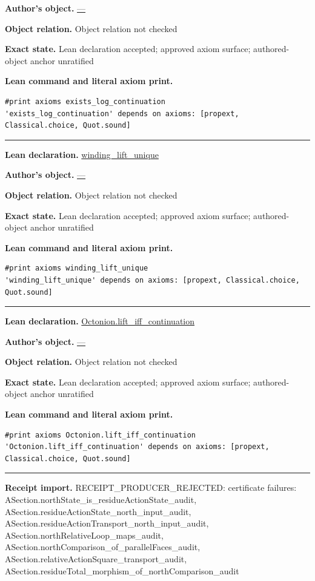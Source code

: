 \documentclass[11pt]{article}
\theoremstyle{plain}
\theoremstyle{definition}
\theoremstyle{remark}
\begin{document}
\begin{tcolorbox}
\par\textbf{Author's object.} \url{—}
\par\textbf{Object relation.} Object relation not checked
\par\textbf{Exact state.} Lean declaration accepted; approved axiom surface; authored-object anchor unratified
\par\smallskip\textbf{Lean command and literal axiom print.}
\begin{Verbatim}[breaklines=true,breakanywhere=true,fontsize=\small]
#print axioms exists_log_continuation
'exists_log_continuation' depends on axioms: [propext, Classical.choice, Quot.sound]
\end{Verbatim}
\medskip\hrule\medskip
\textbf{Lean declaration.} \url{winding_lift_unique}
\par\textbf{Author's object.} \url{—}
\par\textbf{Object relation.} Object relation not checked
\par\textbf{Exact state.} Lean declaration accepted; approved axiom surface; authored-object anchor unratified
\par\smallskip\textbf{Lean command and literal axiom print.}
\begin{Verbatim}[breaklines=true,breakanywhere=true,fontsize=\small]
#print axioms winding_lift_unique
'winding_lift_unique' depends on axioms: [propext, Classical.choice, Quot.sound]
\end{Verbatim}
\medskip\hrule\medskip
\textbf{Lean declaration.} \url{Octonion.lift_iff_continuation}
\par\textbf{Author's object.} \url{—}
\par\textbf{Object relation.} Object relation not checked
\par\textbf{Exact state.} Lean declaration accepted; approved axiom surface; authored-object anchor unratified
\par\smallskip\textbf{Lean command and literal axiom print.}
\begin{Verbatim}[breaklines=true,breakanywhere=true,fontsize=\small]
#print axioms Octonion.lift_iff_continuation
'Octonion.lift_iff_continuation' depends on axioms: [propext, Classical.choice, Quot.sound]
\end{Verbatim}
\medskip\hrule\medskip
\textbf{Receipt import.} \textcolor{KgtRed}{RECEIPT\_PRODUCER\_REJECTED: certificate failures: ASection.northState\_is\_residueActionState\_audit, ASection.residueActionState\_north\_input\_audit, ASection.residueActionTransport\_north\_input\_audit, ASection.northRelativeLoop\_maps\_audit, ASection.northComparison\_of\_parallelFaces\_audit, ASection.relativeActionSquare\_transport\_audit, ASection.residueTotal\_morphism\_of\_northComparison\_audit}
\end{tcolorbox}
\end{document}
